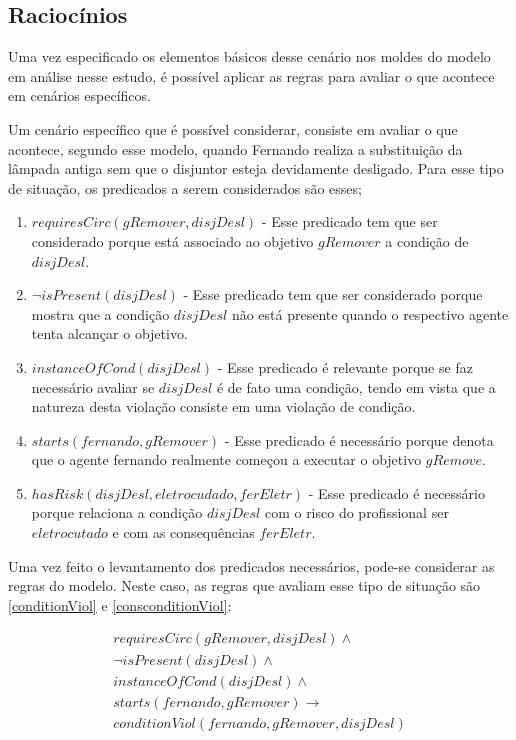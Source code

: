 \subsection{Raciocínios}

Uma vez especificado os elementos básicos desse cenário nos moldes do modelo em análise nesse estudo, é possível aplicar as regras para avaliar o que acontece em cenários específicos. 

Um cenário específico que é possível considerar, consiste em avaliar o que acontece, segundo esse modelo, quando Fernando realiza a substituição da lâmpada antiga sem que o disjuntor esteja devidamente desligado. Para esse tipo de situação, os predicados a serem considerados são esses;

\begin{enumerate}
	\item $requiresCirc(gRemover,disjDesl)$ - Esse predicado tem que ser considerado porque está associado ao objetivo $gRemover$ a condição de $disjDesl$.
	\item $\neg isPresent(disjDesl)$ - Esse predicado tem que ser considerado porque mostra que a condição $disjDesl$ não está presente quando o respectivo agente tenta alcançar o objetivo.
	\item $instanceOfCond(disjDesl)$ - Esse predicado é relevante porque se faz necessário avaliar se $disjDesl$ é de fato uma condição, tendo em vista que a natureza desta violação consiste em uma violação de condição.
	\item $starts(fernando,gRemover)$ - Esse predicado é necessário porque denota que o agente fernando realmente começou a executar o objetivo $gRemove$.
	\item $hasRisk(disjDesl, eletrocudado, ferEletr)$ - Esse predicado é necessário porque relaciona a condição $disjDesl$ com o risco do profissional ser $eletrocutado$ e com as consequências $ferEletr$.
\end{enumerate}

Uma vez feito o levantamento dos predicados necessários, pode-se considerar as regras do modelo. Neste caso, as regras que avaliam esse tipo de situação são \ref{conditionViol} e \ref{consconditionViol}:

\begin{eqnarray}\label{applicationCodViolIntrodCase}\nonumber
	requiresCirc(gRemover,disjDesl) \wedge \\ \nonumber   
	\neg isPresent(disjDesl) \wedge  \\ \nonumber   
	instanceOfCond(disjDesl) \wedge \\ \nonumber   
	starts(fernando,gRemover)  \to \\ \nonumber   
	conditionViol(fernando,gRemover,disjDesl) \nonumber \\  
\end{eqnarray}

